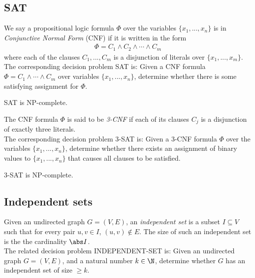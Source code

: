 \documentclass{article}
\begin{document}
\subsection{SAT}

\begin{definition}
	We say a propositional logic formula $\Phi$ over the variables
	$\{x_1, ..., x_n\}$ is in \emph{Conjunctive Normal Form} (CNF)
	if it is written in the form
	\begin{align*}
		\Phi = C_1 \wedge C_2 \wedge \cdots \wedge C_m
	\end{align*}
	where each of the clauses $C_1, ..., C_m$ is a disjunction
	of literals over $\{x_1,...,x_m\}$.\\
	The corresponding decision problem SAT is:
	Given a CNF formula $\Phi=C_1\wedge\cdots\wedge C_m$ over
	variables $\{x_1,...,x_n\}$, determine whether there is some
	satisfying assignment for $\Phi$.	
\end{definition}

\begin{theorem}
	SAT is NP-complete.	
\end{theorem}

\begin{definition}
	The CNF formula $\Phi$ is said to be \emph{3-CNF} if each of its clauses
	$C_j$ is a disjunction of exactly three literals.\\
	The corresponding decision problem 3-SAT is:
	Given a 3-CNF formula $\Phi$ over the variables $\{x_1,...,x_n\}$,
	determine whether there exists an assignment of binary values to
	$\{x_1,...,x_n\}$ that causes all clauses to be satisfied.
\end{definition}

\begin{theorem}
	3-SAT is NP-complete.
\end{theorem}

\subsection{Independent sets}

\begin{definition}
	Given an undirected graph $G=(V,E)$, an \emph{independent set} is
	a subset $I\subseteq V$ such that for every pair $u,v\in I$,
	$(u,v)\not\in E$. The size of such an independent set is the
	the cardinality $\abs I$.\\
	The related decision problem INDEPENDENT-SET is: Given an undirected graph $G=(V,E)$,
	and a natural number $k\in\N$, determine whether $G$ has an independent
	set of size $\geq k$.
\end{definition}
\end{document}
